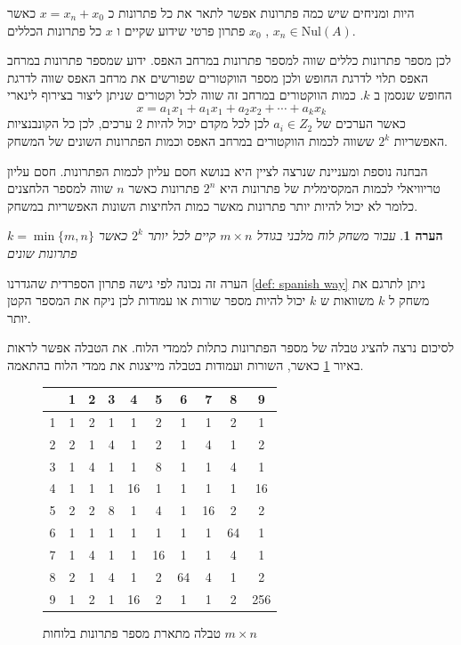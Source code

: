 \documentclass[12pt,leqno]{article}
\theoremstyle{theoremdd}
\newtheorem{comm}{הערה}[section]
\newcommand{\Nul}{\mathrm{Nul}}
\begin{document}
היות ומניחים שיש כמה פתרונות אפשר לתאר את כל פתרונות כ
$x = x_n + x_0$
כאשר 
$x_n \in \Nul(A)$ ,
$x_0$ 
פתרון פרטי שידוע שקיים 
ו
$x$
כל פתרונות הכללים.

לכן מספר פתרונות כללים שווה למספר פתרונות במרחב האפס.
ידוע שמספר פתרונות במרחב האפס תלוי לדרגת החופש ולכן מספר הווקטורים שפורשים
את מרחב האפס שווה לדרגת החופש שנסמן ב
$k$.
כמות הווקטורים במרחב זה שווה לכל וקטורים שניתן ליצור בצירוף לינארי 
\[x = a_1 x_1 + a_1 x_1 + a_2 x_2 + \cdots + a_k x_k\]
כאשר הערכים של
$a_i \in Z_2$
לכן 
לכל מקדם יכול להיות
$2$
ערכים,
לכן כל הקונבנציות האפשריות 
$2^k$
ששווה
לכמות הווקטורים 
במרחב האפס וכמות הפתרונות השונים של המשחק.

הבחנה נוספת ומעניינת שנרצה לציין היא בנושא חסם עליון לכמות הפתרונות.
חסם עליון טריוויאלי לכמות המקסימלית של פתרונות היא 
$2^n$
פתרונות כאשר
$n$
שווה למספר הלחצנים כלומר לא יכול להיות יותר פתרונות מאשר כמות הלחיצות השונות האפשריות במשחק.
\begin{comm}
    עבור משחק לוח מלבני
    בגודל 
    $m \times n$
    קיים לכל יותר 
    $2^k$
    כאשר 
    $k = \min\{m,n\}$
    פתרונות שונים
\end{comm}
הערה זה נכונה לפי גישה פתרון הספרדית
שהגדרנו
\ref{def: spanish way}
ניתן לתרגם את משחק ל
$k$
משוואות 
ש
$k$
יכול להיות מספר שורות או עמודות 
לכן ניקח את המספר הקטן יותר.

לסיכום נרצה להציג טבלה של מספר הפתרונות כתלות לממדי הלוח.
את הטבלה אפשר לראות באיור 
\ref{fig:num-sol-in-table}
כאשר, השורות ועמודות בטבלה מייצגות 
את ממדי הלוח בהתאמה.

\begin{figure}
    \caption{טבלה מתארת מספר פתרונות בלוחות 
    $m \times n$
    }
    \centering
    \label{fig:num-sol-in-table}
    \begin{english}
        \begin{tabular}{ |c||c|c|c|c|c|c|c|c|c| }
            \hline
            \ & 1 & 2 & 3 & 4 & 5 & 6 & 7 & 8 & 9 \\
            \hline
            \hline
            1 & 1 & 2 & 1 & 1 & 2 & 1 & 1 & 2 & 1 \\
            \hline
            2 & 2 & 1 & 4 & 1 & 2 & 1 & 4 & 1 & 2 \\
            \hline
            3 & 1 & 4 & 1 & 1 & 8 & 1 & 1 & 4 & 1 \\
            \hline
            4 & 1 & 1 & 1 & 16 & 1 & 1 & 1 & 1 & 16 \\
            \hline
            5 & 2 & 2 & 8 & 1 & 4 & 1 & 16 & 2 & 2 \\
            \hline
            6 & 1 & 1 & 1 & 1 & 1 & 1 & 1 & 64 & 1 \\
            \hline
            7 & 1 & 4 & 1 & 1 & 16 & 1 & 1 & 4 & 1 \\
            \hline
            8 & 2 & 1 & 4 & 1 & 2 & 64 & 4 & 1 & 2 \\
            \hline
            9 & 1 & 2 & 1 & 16 & 2 & 1 & 1 & 2 & 256 \\
            \hline
        \end{tabular}
    \end{english}
\end{figure}
\end{document}
